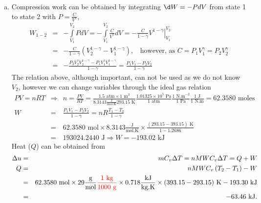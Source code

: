 \documentclass[12pts,a4paper,amsmath,amssymb,floatfix]{article}%
\newcommand{\frc}{\displaystyle\frac}
\newcommand{\red}{\textcolor{red}}
\begin{document}
\begin{enumerate}[1)]
\begin{enumerate}[(a)]
           \item Compression work can be obtained by integrating $\d W = -P dV$ from state 1 to state 2 with $P=\frac{C}{V^{\gamma}}$,
               \begin{eqnarray}
                 W_{1-2} &=& -\int\limits_{V_{1}}^{V_{2}} P dV = -\int\limits_{V_{1}}^{V_{2}}\frc{C}{V^{\gamma}} dV = -\left.\frc{C}{1-\gamma}V^{1-\gamma}\right|_{V_{1}}^{V_{2}} \nonumber \\
                         &=& -\frc{C}{1-\gamma}\left(V_{2}^{1-\gamma}-V_{1}^{1-\gamma}\right),\;\;\text{ however, as } C=P_{1}V_{1}^{\gamma}=P_{2}V_{2}^{\gamma} \nonumber \\
                         &=& -\frc{P_{2}V_{2}^{\gamma}V_{2}^{1-\gamma} - P_{1}V_{1}^{\gamma}V_{1}^{1-\gamma}}{1-\gamma} = \frc{P_{1}V_{1}-P_{2}V_{2}}{1-\gamma} \nonumber
               \end{eqnarray}
               The relation above, although important, can not be used as we do not know $V_{2}$, however we can change variables through the ideal gas relation
               \begin{eqnarray}
                  P V = n R T &\Rightarrow& n = \frc{P V}{R T } = \frc{1.5\text{ atm} \times 1\text{ m}^{3}}{ 8.3143 \frc{\text{J}}{\text{mol.K}} 293.15\text{ K}} \frc{1.01325\times 10^{5} \text{ Pa}}{1 \text{ atm}} \frc{ 1 \text{ N.m}^{-2}}{1\text{ Pa}}\frc{1 \text{ J}}{1\text{ N.m}} = 62.3580\text{ moles}\nonumber \\
                    W &=& \frc{P_{1}V_{1}-P_{2}V_{2}}{1-\gamma} = nR\frc{T_{1}- T_{2}}{1-\gamma} \nonumber \\
                      &=& 62.3580\text{ mol} \times 8.3143 \frc{\text{J}}{\text{mol.K}} \times \frc{\left(293.15-393.15\right)\text{ K}}{1-1.2686} \nonumber \\
                      &=& 193024.2440 \text{ J} \Longrightarrow W = -193.02 \text{ kJ} \nonumber
               \end{eqnarray}
              Heat ($Q$) can be obtained from
               \begin{eqnarray}
          \Delta u &=& m C_{v}\Delta T = n MW C_{v}\Delta T = Q + W  \nonumber \\
             Q &=& n MW C_{v}\left(T_{2}-T_{1}\right) - W \nonumber \\
               &=& 62.3580\text{ mol}\times 29 \frc{\text{g}}{\text{mol}} \red{\frc{1\text{ kg}}{1000\text{ g}}}\times 0.718\frc{\text{kJ}}{\text{kg.K}}\times (393.15-293.15)\text{ K} - 193.30 \text{ kJ} \nonumber \\
                                                          &=& -63.46\text{ kJ}. \nonumber                   
               \end{eqnarray}
       \end{enumerate}



\end{enumerate}
\end{document}
